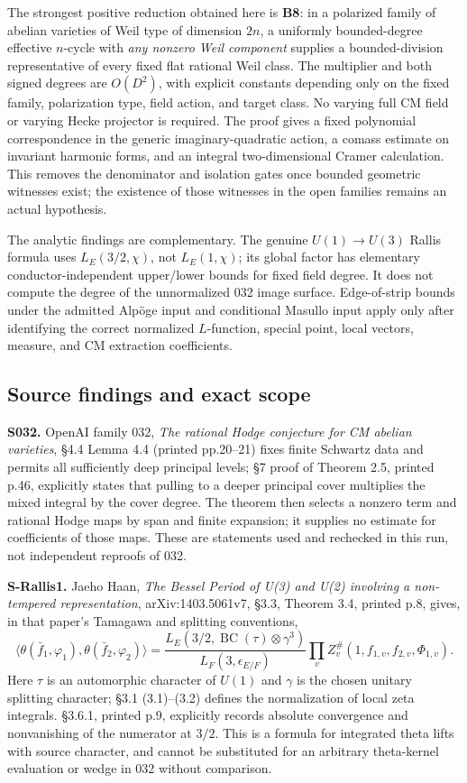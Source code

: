 \documentclass[11pt,a4paper]{article}
\theoremstyle{definition}
\begin{document}
The strongest positive reduction obtained here is \textbf{B8}: in a polarized family of abelian varieties of Weil type of dimension \(2n\), a uniformly bounded-degree effective \(n\)-cycle with \emph{any nonzero Weil component} supplies a bounded-division representative of every fixed flat rational Weil class. The multiplier and both signed degrees are \(O(D^2)\), with explicit constants depending only on the fixed family, polarization type, field action, and target class. No varying full CM field or varying Hecke projector is required. The proof gives a fixed polynomial correspondence in the generic imaginary-quadratic action, a comass estimate on invariant harmonic forms, and an integral two-dimensional Cramer calculation. This removes the denominator and isolation gates once bounded geometric witnesses exist; the existence of those witnesses in the open families remains an actual hypothesis.

The analytic findings are complementary. The genuine \(U(1)\to U(3)\) Rallis formula uses \(L_E(3/2,\chi)\), not \(L_E(1,\chi)\); its global factor has elementary conductor-independent upper/lower bounds for fixed field degree. It does not compute the degree of the unnormalized 032 image surface. Edge-of-strip bounds under the admitted Alpöge input and conditional Masullo input apply only after identifying the correct normalized \(L\)-function, special point, local vectors, measure, and CM extraction coefficients.

\subsection{Source findings and exact scope}\label{source-findings-and-exact-scope}

\textbf{S032.} OpenAI family 032, \emph{The rational Hodge conjecture for CM abelian varieties}, §4.4 Lemma 4.4 (printed pp.20--21) fixes finite Schwartz data and permits all sufficiently deep principal levels; §7 proof of Theorem 2.5, printed p.46, explicitly states that pulling to a deeper principal cover multiplies the mixed integral by the cover degree. The theorem then selects a nonzero term and rational Hodge maps by span and finite expansion; it supplies no estimate for coefficients of those maps. These are statements used and rechecked in this run, not independent reproofs of 032.

\textbf{S-Rallis1.} Jaeho Haan, \emph{The Bessel Period of U(3) and U(2) involving a non-tempered representation}, arXiv:1403.5061v7, §3.3, Theorem 3.4, printed p.8, gives, in that paper's Tamagawa and splitting conventions, \[
\langle\theta(\bar f_1,\varphi_1),\theta(\bar f_2,\varphi_2)\rangle
 = \frac{L_E(3/2,\operatorname{BC}(\tau)\otimes\gamma^3)}{L_F(3,\epsilon_{E/F})}
 \prod_v Z_v^{\#}(1,f_{1,v},f_{2,v},\Phi_{1,v}).
\] Here \(\tau\) is an automorphic character of \(U(1)\) and \(\gamma\) is the chosen unitary splitting character; §3.1 (3.1)--(3.2) defines the normalization of local zeta integrals. §3.6.1, printed p.9, explicitly records absolute convergence and nonvanishing of the numerator at \(3/2\). This is a formula for integrated theta lifts with source character, and cannot be substituted for an arbitrary theta-kernel evaluation or wedge in 032 without comparison.
\end{document}
